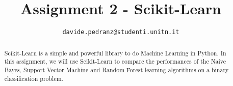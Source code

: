 \documentclass[conference]{IEEEtran}
\begin{document}
\title{Assignment 2 - Scikit-Learn}
\author{
	\texttt{davide.pedranz@studenti.unitn.it}
}

\maketitle

\begin{abstract}
Scikit-Learn is a simple and powerful library to do Machine Learning in Python.
In this assignment, we will use Scikit-Learn to compare the performances of the Naive Bayes, Support Vector Machine and Random Forest learning algorithms on a binary classification problem.
\end{abstract}

\acresetall










% 
% 
\end{document}

